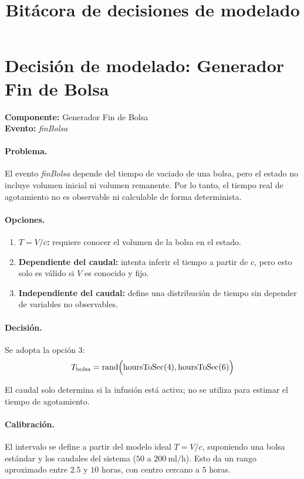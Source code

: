 \documentclass[11pt]{article}
\title{Bitácora de decisiones de modelado}
\author{}
\date{}
\begin{document}
\section{Decisión de modelado: Generador Fin de Bolsa}

\noindent\textbf{Componente:} Generador Fin de Bolsa \\
\textbf{Evento:} \textit{finBolsa}

\paragraph{Problema.}
El evento \textit{finBolsa} depende del tiempo de vaciado de una bolsa, pero el estado no incluye volumen inicial ni volumen remanente. Por lo tanto, el tiempo real de agotamiento no es observable ni calculable de forma determinista.

\paragraph{Opciones.}
\begin{enumerate}
    \item \textbf{$T = V/c$:} requiere conocer el volumen de la bolsa en el estado.
    \item \textbf{Dependiente del caudal:} intenta inferir el tiempo a partir de $c$, pero esto solo es válido si $V$ es conocido y fijo.
    \item \textbf{Independiente del caudal:} define una distribución de tiempo sin depender de variables no observables.
\end{enumerate}

\paragraph{Decisión.}
Se adopta la opción 3:
\[
T_{\mathrm{bolsa}} = \text{rand}\Bigl(\operatorname{hoursToSec}(4), \operatorname{hoursToSec}(6)\Bigr)
\]

El caudal solo determina si la infusión está activa; no se utiliza para estimar el tiempo de agotamiento.

\paragraph{Calibración.}
El intervalo se define a partir del modelo ideal $T = V/c$, suponiendo una bolsa estándar y los caudales del sistema ($50$ a $200\ \mathrm{ml/h}$). Esto da un rango aproximado entre $2.5$ y $10$ horas, con centro cercano a $5$ horas.
\end{document}
